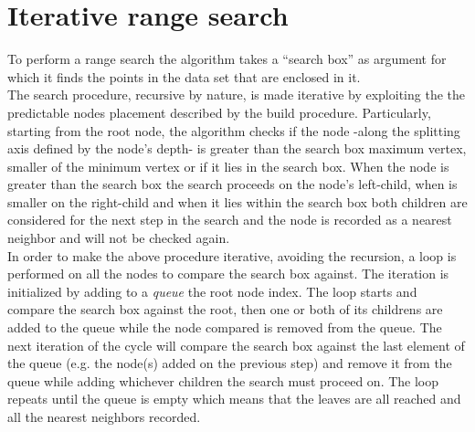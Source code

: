 \section{Iterative range search}
To perform a range search the algorithm takes a ``search box'' as argument for which it finds the points in the data set that are enclosed in it.\\
The search procedure, recursive by nature, is made iterative by exploiting the the predictable nodes placement described by the build procedure. Particularly, starting from the root node, the algorithm checks if the node -along the splitting axis defined by the node's depth- is greater than the search box maximum vertex, smaller of the minimum vertex or if it lies in the search box. When the node is greater than the search box the search proceeds on the node's left-child, when is smaller on the right-child and when it lies within the search box both children are considered for the next step in the search and the node is recorded as a nearest neighbor and will not be checked again.\\
In order to make the above procedure iterative, avoiding the recursion, a loop is performed on all the nodes to compare the search box against. The iteration is initialized by adding to a \textit{queue} the root node index. The loop starts and compare the search box against the root, then one or both of its childrens are added to the queue while the node compared is removed from the queue. The next iteration of the cycle will compare the search box against the last element of the queue (e.g. the node(s) added on the previous step) and remove it from the queue while adding whichever children the search must proceed on. The loop repeats until the queue is empty which means that the leaves are all reached and all the nearest neighbors recorded.\\

